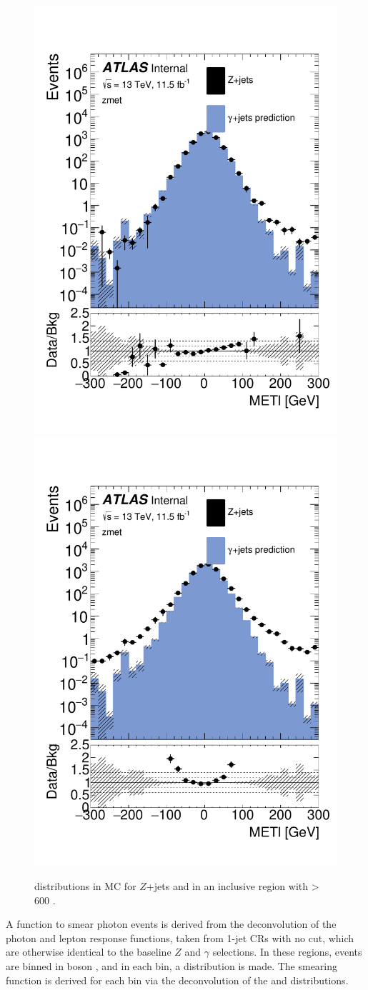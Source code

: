 \begin{centering}
\begin{figure}[!hbt]
\myfloatalign
\includegraphics[width=.45\linewidth]{figures/photons/MC_hist_METl_Pt_0_ee_2j_2016_mcmetl_ptrw__zmet_.pdf}
\includegraphics[width=.45\linewidth]{figures/photons/MC_hist_METl_Pt_0_mm_2j_2016_mcmetl_ptrw__zmet_.pdf}
\caption{\metl distributions in \ac{MC} for $Z$+jets and \gjets in an inclusive region with \HT > 600 \gev.}
\label{fig:photon_metparallel}
\end{figure}
\end{centering}

A function to smear photon events is derived from the deconvolution of the photon and lepton response functions, taken from 1-jet \acp{CR} with no \HT cut, which are otherwise identical to the baseline $Z$ and $\gamma$ selections. In these regions, events are binned in boson \pt, and in each bin, a \metl distribution is made. The smearing function is derived for each bin via the deconvolution of the \dyjets and \gjets distributions. 

